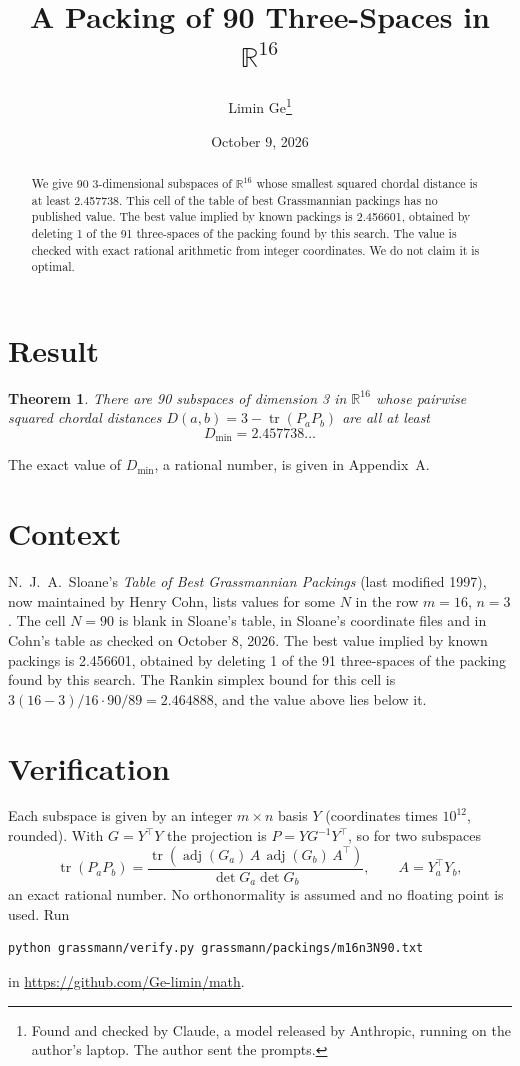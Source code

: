 \documentclass[11pt,a4paper]{article}
\title{A Packing of 90 Three-Spaces in $\mathbb{R}^{16}$}
\author{Limin Ge\thanks{Found and checked by Claude, a model released by Anthropic, running on the author's laptop. The author sent the prompts.}}
\date{October 9, 2026}
\newtheorem*{theorem}{Theorem}
\begin{document}
\maketitle
\begin{abstract}
We give 90 3-dimensional subspaces of $\mathbb{R}^{16}$ whose smallest squared chordal distance is at least 2.457738. This cell of the table of best Grassmannian packings has no published value. The best value implied by known packings is 2.456601, obtained by deleting 1 of the 91 three-spaces of the packing found by this search. The value is checked with exact rational arithmetic from integer coordinates. We do not claim it is optimal.
\end{abstract}

\section{Result}
\begin{theorem}
There are 90 subspaces of dimension 3 in $\mathbb{R}^{16}$ whose pairwise squared chordal distances $D(a,b) = 3 - \operatorname{tr}(P_aP_b)$ are all at least
\[ D_{\min} = 2.457738\ldots \]
\end{theorem}
The exact value of $D_{\min}$, a rational number, is given in Appendix~A.


\section{Context}
N.~J.~A.~Sloane's \emph{Table of Best Grassmannian Packings} (last modified 1997), now maintained by Henry Cohn, lists values for some $N$ in the row $m=16$, $n=3$. The cell $N=90$ is blank in Sloane's table, in Sloane's coordinate files and in Cohn's table as checked on October 8, 2026. The best value implied by known packings is 2.456601, obtained by deleting 1 of the 91 three-spaces of the packing found by this search. The Rankin simplex bound for this cell is $3(16-3)/16\cdot 90/89 = 2.464888$, and the value above lies below it.


\section{Verification}
Each subspace is given by an integer $m\times n$ basis $Y$ (coordinates times $10^{12}$, rounded). With $G=Y^\top Y$ the projection is $P=YG^{-1}Y^\top$, so for two subspaces
\[ \operatorname{tr}(P_aP_b)=\frac{\operatorname{tr}(\operatorname{adj}(G_a)\,A\,\operatorname{adj}(G_b)\,A^\top)}{\det G_a\det G_b},\qquad A=Y_a^\top Y_b, \]
an exact rational number. No orthonormality is assumed and no floating point is used. Run
\begin{verbatim}
python grassmann/verify.py grassmann/packings/m16n3N90.txt
\end{verbatim}
in \url{https://github.com/Ge-limin/math}.
\end{document}
